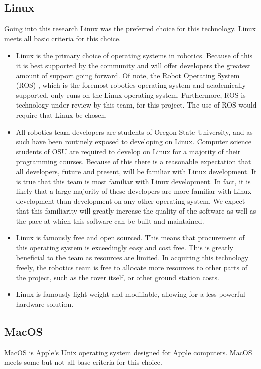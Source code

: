 \documentclass[onecolumn, draftclsnofoot, 10pt, compsoc]{IEEEtran}
\begin{document}
\subsection{Linux}
Going into this research Linux was the preferred choice for this technology.
Linux meets all basic criteria for this choice.
\begin{itemize}
\item 
Linux is the primary choice of operating systems in robotics. 
Because of this it is best supported by the community and will offer developers the greatest amount of support going forward.
Of note, the Robot Operating System (ROS) \cite{rossupport}, which is the foremost robotics operating system and academically supported, only runs on the Linux operating system.
Furthermore, ROS is technology under review by this team, for this project.
The use of ROS would require that Linux be chosen.

\item 
All robotics team developers are students of Oregon State University, and as such have been routinely exposed to developing on Linux.
Computer science students of OSU are required to develop on Linux for a majority of their programming courses.
Because of this there is a reasonable expectation that all developers, future and present, will be familiar with Linux development.
It is true that this team is most familiar with Linux development.
In fact, it is likely that a large majority of these developers are more familiar with Linux development than development on any other operating system.
We expect that this familiarity will greatly increase the quality of the software as well as the pace at which this software can be built and maintained.

\item
Linux is famously free and open sourced.
This means that procurement of this operating system is exceedingly easy and cost free.
This is greatly beneficial to the team as resources are limited.
In acquiring this technology freely, the robotics team is free to allocate more resources to other parts of the project, such as the rover itself, or other ground station costs.

\item
Linux is famously light-weight and modifiable, allowing for a less powerful hardware solution.

\end{itemize}


\subsection{MacOS}
MacOS is Apple's Unix operating system designed for Apple computers.
MacOS meets some but not all base criteria for this choice.
\end{document}
